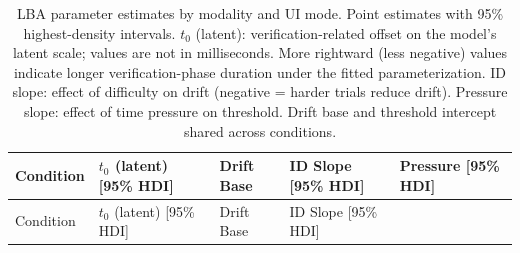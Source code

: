 \documentclass[
  11pt,
  11pt,
  letterpaper]{article}
\begin{document}
\begin{longtable}[]{@{}
  >{\raggedright\arraybackslash}p{}
  >{\centering\arraybackslash}p{}
  >{\centering\arraybackslash}p{}
  >{\centering\arraybackslash}p{}
  >{\centering\arraybackslash}p{}@{}}
\caption{LBA parameter estimates by modality and UI mode. Point
estimates with 95\% highest-density intervals. \(t_0\) (latent):
verification-related offset on the model's latent scale; values are not
in milliseconds. More rightward (less negative) values indicate longer
verification-phase duration under the fitted parameterization. ID slope:
effect of difficulty on drift (negative = harder trials reduce drift).
Pressure slope: effect of time pressure on threshold. Drift base and
threshold intercept shared across
conditions.}\label{tbl-lba-params}\tabularnewline
\toprule\noalign{}
\begin{minipage}[b]{\linewidth}\raggedright
Condition
\end{minipage} & \begin{minipage}[b]{\linewidth}\centering
\(t_0\) (latent) {[}95\% HDI{]}
\end{minipage} & \begin{minipage}[b]{\linewidth}\centering
Drift Base
\end{minipage} & \begin{minipage}[b]{\linewidth}\centering
ID Slope {[}95\% HDI{]}
\end{minipage} & \begin{minipage}[b]{\linewidth}\centering
Pressure {[}95\% HDI{]}
\end{minipage} \\
\midrule\noalign{}
\endfirsthead
\toprule\noalign{}
\begin{minipage}[b]{\linewidth}\raggedright
Condition
\end{minipage} & \begin{minipage}[b]{\linewidth}\centering
\(t_0\) (latent) {[}95\% HDI{]}
\end{minipage} & \begin{minipage}[b]{\linewidth}\centering
Drift Base
\end{minipage} & \begin{minipage}[b]{\linewidth}\centering
ID Slope {[}95\% HDI{]}
\end{minipage} & \begin{minipage}[b]{\linewidth}\centering

\end{minipage}
\end{longtable}
\end{document}
